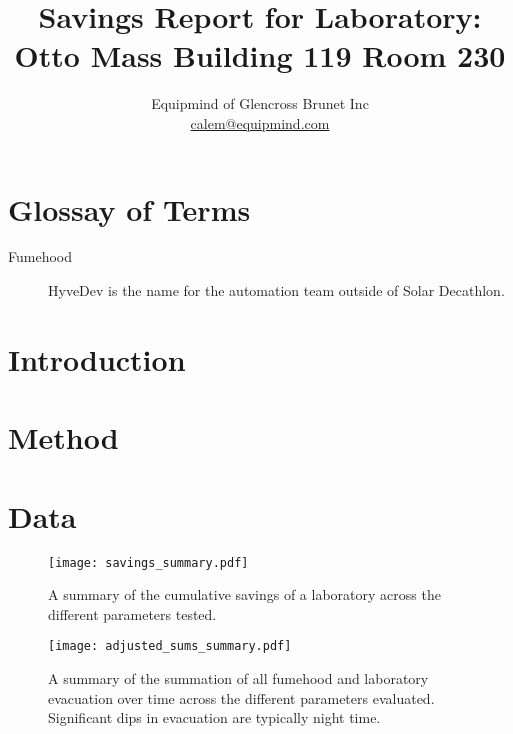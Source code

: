 

\title{Savings Report for Laboratory: \vspace{.1em} \\  Otto Mass Building 119 Room 230}
\author{
\large
{ Equipmind of Glencross Brunet Inc \\
\normalsize \href{mailto:calem@equipmind.com}{calem@equipmind.com}
}
}
\date{}



\section{Glossay of Terms}

	\begin{description}
		\item[Fumehood ] HyveDev is the name for the automation team outside of Solar Decathlon.
	\end{description}

\section{Introduction}

\section{Method}

\section{Data}

	\begin{figure*}
		\centering
		\texttt{[image: savings\_summary.pdf]}
		\caption{A summary of the cumulative savings of a laboratory across the different parameters tested.}
	\end{figure*}

	\begin{figure*}
		\centering
		\texttt{[image: adjusted\_sums\_summary.pdf]}
		\caption{A summary of the summation of all fumehood and laboratory evacuation over time across the different parameters evaluated.  Significant dips in evacuation are typically night time.}
	\end{figure*}

